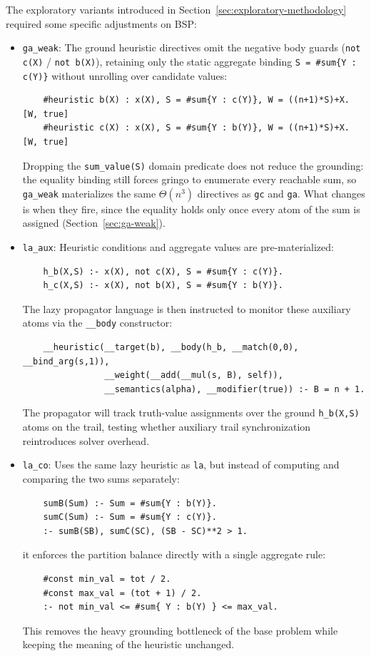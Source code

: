 The exploratory variants introduced in Section~\ref{sec:exploratory-methodology} required some specific adjustments on BSP:
\begin{itemize}
    \item \texttt{ga\_weak}: The ground heuristic directives omit the negative body guards (\texttt{not c(X)} / \texttt{not b(X)}), retaining only the static aggregate binding \texttt{S = \#sum\{Y : c(Y)\}} without unrolling over candidate values:
    \begin{verbatim}
    #heuristic b(X) : x(X), S = #sum{Y : c(Y)}, W = ((n+1)*S)+X. [W, true]
    #heuristic c(X) : x(X), S = #sum{Y : b(Y)}, W = ((n+1)*S)+X. [W, true]
    \end{verbatim}
    Dropping the \texttt{sum\_value(S)} domain predicate does not reduce the grounding: the equality binding still forces gringo to enumerate every reachable sum, so \texttt{ga\_weak} materializes the same $\Theta(n^3)$ directives as \texttt{gc} and \texttt{ga}. What changes is when they fire, since the equality holds only once every atom of the sum is assigned (Section~\ref{sec:ga-weak}).

    \item \texttt{la\_aux}: Heuristic conditions and aggregate values are pre-materialized:
    \begin{verbatim}
    h_b(X,S) :- x(X), not c(X), S = #sum{Y : c(Y)}.
    h_c(X,S) :- x(X), not b(X), S = #sum{Y : b(Y)}.
    \end{verbatim}
    The lazy propagator language is then instructed to monitor these auxiliary atoms via the \texttt{\_\_body} constructor:
    \begin{verbatim}
    __heuristic(__target(b), __body(h_b, __match(0,0), __bind_arg(s,1)),
                __weight(__add(__mul(s, B), self)),
                __semantics(alpha), __modifier(true)) :- B = n + 1.
    \end{verbatim}
    The propagator will track truth-value assignments over the ground \texttt{h\_b(X,S)} atoms on the trail, testing whether auxiliary trail synchronization reintroduces solver overhead.

    \item \texttt{la\_co}: Uses the same lazy heuristic as \texttt{la}, but instead of computing and comparing the two sums separately:
    \begin{verbatim}
    sumB(Sum) :- Sum = #sum{Y : b(Y)}.
    sumC(Sum) :- Sum = #sum{Y : c(Y)}.
    :- sumB(SB), sumC(SC), (SB - SC)**2 > 1.
    \end{verbatim}
    it enforces the partition balance directly with a single aggregate rule:
    \begin{verbatim}
    #const min_val = tot / 2.
    #const max_val = (tot + 1) / 2.
    :- not min_val <= #sum{ Y : b(Y) } <= max_val.
    \end{verbatim}
    This removes the heavy grounding bottleneck of the base problem while keeping the meaning of the heuristic unchanged.
\end{itemize}


